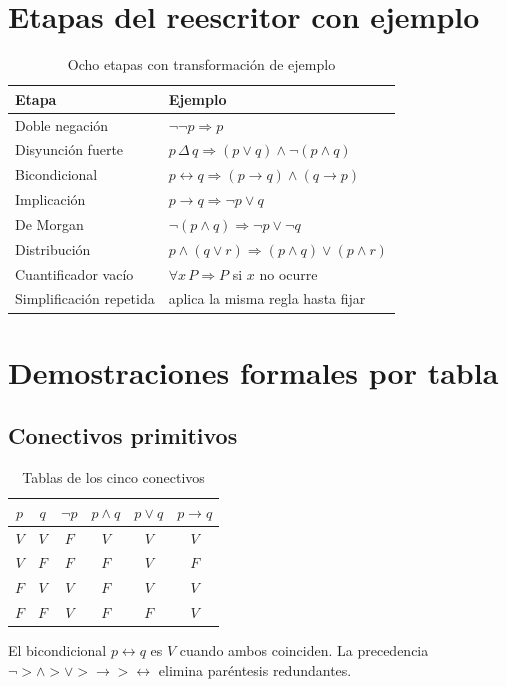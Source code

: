 \documentclass[11pt,a4paper,openany]{book}
\begin{document}
\chapter{Etapas del reescritor con ejemplo}
\label{ch:etapas}
\begin{table}[H]
\centering
\caption{Ocho etapas con transformaci\'on de ejemplo}
\begin{tabular}{ll}
\toprule
Etapa & Ejemplo \\
\midrule
Doble negaci\'on & $\lnot\lnot p \Rightarrow p$ \\
Disyunci\'on fuerte & $p \,\Delta\, q \Rightarrow (p \lor q) \land \lnot(p \land q)$ \\
Bicondicional & $p \leftrightarrow q \Rightarrow (p \to q) \land (q \to p)$ \\
Implicaci\'on & $p \to q \Rightarrow \lnot p \lor q$ \\
De Morgan & $\lnot(p \land q) \Rightarrow \lnot p \lor \lnot q$ \\
Distribuci\'on & $p \land (q \lor r) \Rightarrow (p \land q) \lor (p \land r)$ \\
Cuantificador vac\'io & $\forall x\,P \Rightarrow P$ si $x$ no ocurre \\
Simplificaci\'on repetida & aplica la misma regla hasta fijar \\
\bottomrule
\end{tabular}
\end{table}


\chapter{Demostraciones formales por tabla}
\label{ch:demos}
\section{Conectivos primitivos}
\begin{table}[H]
\centering
\caption{Tablas de los cinco conectivos}
\begin{tabular}{cc|c|c|c|c}
\toprule
$p$ & $q$ & $\lnot p$ & $p \land q$ & $p \lor q$ & $p \to q$ \\
\midrule
$V$ & $V$ & $F$ & $V$ & $V$ & $V$ \\
$V$ & $F$ & $F$ & $F$ & $V$ & $F$ \\
$F$ & $V$ & $V$ & $F$ & $V$ & $V$ \\
$F$ & $F$ & $V$ & $F$ & $F$ & $V$ \\
\bottomrule
\end{tabular}
\end{table}
El bicondicional $p \leftrightarrow q$ es $V$ cuando ambos coinciden. La precedencia $\lnot > \land > \lor > \to > \leftrightarrow$ elimina par\'entesis redundantes.
\end{document}
